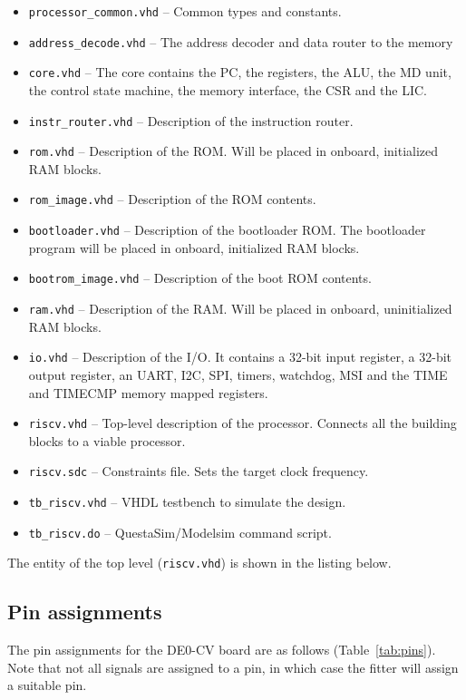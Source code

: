 \documentclass[12pt]{article}
\begin{document}
\begin{itemize}
\item \lstinline|processor_common.vhd| -- Common types and constants.
\item \lstinline|address_decode.vhd| -- The address decoder and data router to the memory \item \lstinline|core.vhd| -- The core contains the PC, the registers, the ALU, the MD unit, the control state machine, the memory interface, the CSR and the LIC.
\item \lstinline|instr_router.vhd| -- Description of the instruction router.
\item \lstinline|rom.vhd| -- Description of the ROM. Will be placed in onboard, initialized RAM blocks. 
\item \lstinline|rom_image.vhd| -- Description of the ROM contents.
\item \lstinline|bootloader.vhd| -- Description of the bootloader ROM. The bootloader program will be placed in onboard, initialized RAM blocks.
\item \lstinline|bootrom_image.vhd| -- Description of the boot ROM contents.
\item \lstinline|ram.vhd| -- Description of the RAM. Will be placed in onboard, uninitialized RAM blocks. 
\item \lstinline|io.vhd| -- Description of the I/O. It contains a 32-bit input register, a 32-bit output register, an UART, I2C, SPI, timers, watchdog, MSI and the TIME and TIMECMP memory mapped registers.
\item \lstinline|riscv.vhd| -- Top-level description of the processor. Connects all the building blocks to a viable processor.
\item \lstinline|riscv.sdc| -- Constraints file. Sets the target clock frequency.
\item \lstinline|tb_riscv.vhd| -- VHDL testbench to simulate the design.
\item \lstinline|tb_riscv.do| -- QuestaSim/Modelsim command script.
\end{itemize}

The entity of the top level (\lstinline|riscv.vhd|) is shown in the listing below.



\subsection{Pin assignments}
The pin assignments for the DE0-CV board are as follows (Table~\ref{tab:pins}). Note that not all signals are assigned to a pin, in which case the fitter will assign a suitable pin.
\end{document}
